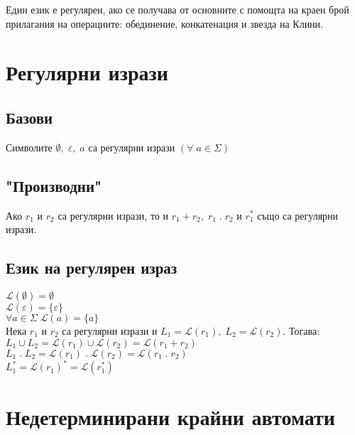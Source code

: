 \documentclass[12pt]{article}
\newcommand{\Lang}{\mathcal{L}}
\begin{document}
Един език е регулярен, ако се получава от основните с помощта на краен брой прилагания на операциите: обединение, конкатенация и звезда на Клини. 

\section*{Регулярни изрази}

\subsection*{Базови}

Символите $\emptyset, \; \varepsilon, \; a$ са регулярни изрази $(\forall \; a \in \Sigma)$ \\

\subsection*{"Производни"}

Ако $r_1$ и $r_2$ са регулярни изрази, то и $r_1 + r_2, \; r_1 \; . \; r_2$ и $r_1^*$ също са регулярни изрази.

\subsection*{Език на регулярен израз}

$\Lang(\emptyset) = \emptyset$ \\

$\Lang(\varepsilon) = \{\varepsilon\}$ \\

$\forall a \in \Sigma \; \Lang(a) = \{a\}$ \\

Нека $r_1$ и $r_2$ са регулярни изрази и $L_1 = \Lang(r_1), \; L_2 = \Lang(r_2)$. Тогава: \\

$L_1 \cup L_2 = \Lang(r_1) \cup \Lang(r_2) = \Lang(r_1 + r_2)$ \\

$L_1 \; . \; L_2 = \Lang(r_1) \; . \; \Lang(r_2) = \Lang(r_1 \; . \; r_2)$ \\

$L_1^* = \Lang(r_1)^* = \Lang(r_1^*)$

\section*{Недетерминирани крайни автомати}
\end{document}
